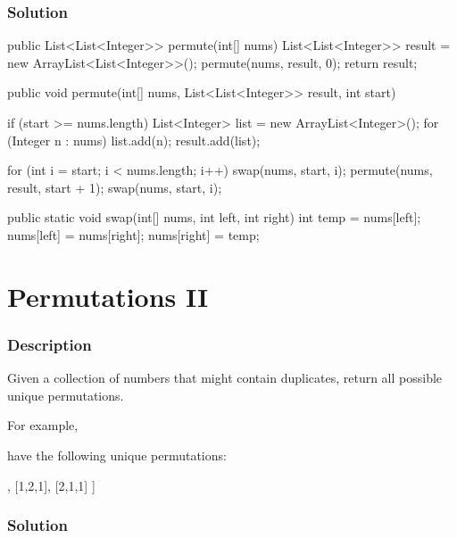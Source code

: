 \subsubsection{Solution}
\begin{Code}
public List<List<Integer>> permute(int[] nums) {
    List<List<Integer>> result = new ArrayList<List<Integer>>();
    permute(nums, result, 0);
    return result;
}

public void permute(int[] nums, List<List<Integer>> result, int start) {
    if (start >= nums.length) {
        List<Integer> list = new ArrayList<Integer>();
        for (Integer n : nums) {
            list.add(n);
        }
        result.add(list);
    }

    for (int i = start; i < nums.length; i++) {
        swap(nums, start, i);
        permute(nums, result, start + 1);
        swap(nums, start, i);
    }
}

public static void swap(int[] nums, int left, int right) {
    int temp = nums[left];
    nums[left] = nums[right];
    nums[right] = temp;
}
\end{Code}

\newpage

\section{Permutations II} %

\subsubsection{Description}

Given a collection of numbers that might contain duplicates, return all possible unique permutations.

For example,

\code{[1,1,2]} have the following unique permutations:
\begin{Code}
[
  [1,1,2],
  [1,2,1],
  [2,1,1]
]
\end{Code}

\subsubsection{Solution}

\begin{Code}

\end{Code}

\newpage

